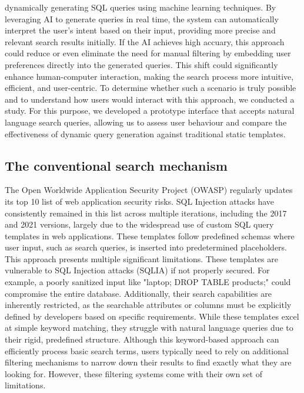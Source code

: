 \documentclass[../../submission.tex]{subfiles}
\begin{document}
dynamically generating SQL queries using machine learning techniques. By leveraging AI to generate queries in real time, the system can automatically interpret 
the user’s intent based on their input, providing more precise and relevant search results initially.
If the AI achieves high accuary, this approach could reduce or even eliminate the need for manual filtering by embedding user preferences directly into the generated queries. 
This shift could significantly enhance human-computer interaction, making the search process more intuitive, efficient, and user-centric.
To determine whether such a scenario is truly possible and to understand how users would interact with this approach, we conducted a study. 
For this purpose, we developed a prototype interface that accepts natural language search queries, allowing us to assess user behaviour and 
compare the effectiveness of dynamic query generation against traditional static templates.

\subsection{The conventional search mechanism}
The Open Worldwide Application Security Project (OWASP) regularly updates its top 10 list of web application security risks.
SQL Injection attacks have consistently remained in this list across multiple iterations, including the 2017 and 2021 versions,
largely due to the widespread use of custom SQL query templates in web applications\cite{owaspfoundationOWASPTopTen2024}. These templates
follow predefined schemas where user input, such as search queries, is inserted into predetermined placeholders. This approach
presents multiple significant limitations. These templates are vulnerable to SQL Injection attacks (SQLIA) if 
not properly secured. For example, a poorly sanitized input like "laptop; DROP TABLE products;" could compromise the entire database. 
Additionally, their search capabilities are inherently restricted, as the searchable attributes 
or columns must be explicitly defined by developers based on specific requirements. While these templates excel at 
simple keyword matching, they 
struggle with natural language queries due to their rigid, predefined structure. Although this keyword-based 
approach can efficiently process basic search terms, users typically need to rely on additional filtering 
mechanisms to narrow down their results to find exactly what they are looking for. However, these filtering 
systems come with their own set of limitations.
\end{document}
